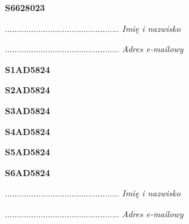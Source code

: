 \begin{turn}{90}\huge \textbf{S6628023}\end{turn}

\begin{turn}{90}\begin{minipage}{\linewidth} \vspace{20mm} ................................................  \textit{Imię i nazwisko}\end{minipage}\end{turn}

\begin{turn}{90}\begin{minipage}{\linewidth} \vspace{20mm} ................................................  \textit{Adres e-mailowy}\end{minipage}\end{turn}

\begin{turn}{90}\huge \textbf{S1AD5824}\end{turn}

\begin{turn}{90}\huge \textbf{S2AD5824}\end{turn}

\begin{turn}{90}\huge \textbf{S3AD5824}\end{turn}

\begin{turn}{90}\huge \textbf{S4AD5824}\end{turn}

\begin{turn}{90}\huge \textbf{S5AD5824}\end{turn}

\begin{turn}{90}\huge \textbf{S6AD5824}\end{turn}

\begin{turn}{90}\begin{minipage}{\linewidth} \vspace{20mm} ................................................  \textit{Imię i nazwisko}\end{minipage}\end{turn}

\begin{turn}{90}\begin{minipage}{\linewidth} \vspace{20mm} ................................................  \textit{Adres e-mailowy}\end{minipage}\end{turn}

